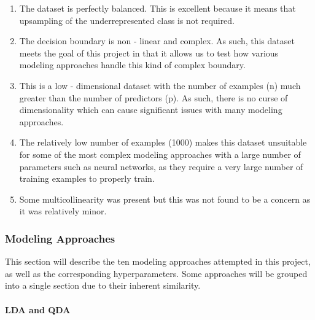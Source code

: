 \documentclass[
]{article}
\begin{document}
\begin{enumerate}
\def\labelenumi{\arabic{enumi})}
\item
  The dataset is perfectly balanced. This is excellent because it means
  that upsampling of the underrepresented class is not required.
\item
  The decision boundary is non - linear and complex. As such, this
  dataset meets the goal of this project in that it allows us to test
  how various modeling approaches handle this kind of complex boundary.
\item
  This is a low - dimensional dataset with the number of examples (n)
  much greater than the number of predictors (p). As such, there is no
  curse of dimensionality which can cause significant issues with many
  modeling approaches.
\item
  The relatively low number of examples (1000) makes this dataset
  unsuitable for some of the most complex modeling approaches with a
  large number of parameters such as neural networks, as they require a
  very large number of training examples to properly train.
\item
  Some multicollinearity was present but this was not found to be a
  concern as it was relatively minor.
\end{enumerate}

\hypertarget{modeling-approaches}{%
\subsubsection{Modeling Approaches}\label{modeling-approaches}}

This section will describe the ten modeling approaches attempted in this
project, as well as the corresponding hyperparameters. Some approaches
will be grouped into a single section due to their inherent similarity.

\hypertarget{lda-and-qda}{%
\paragraph{LDA and QDA}\label{lda-and-qda}}
\end{document}
